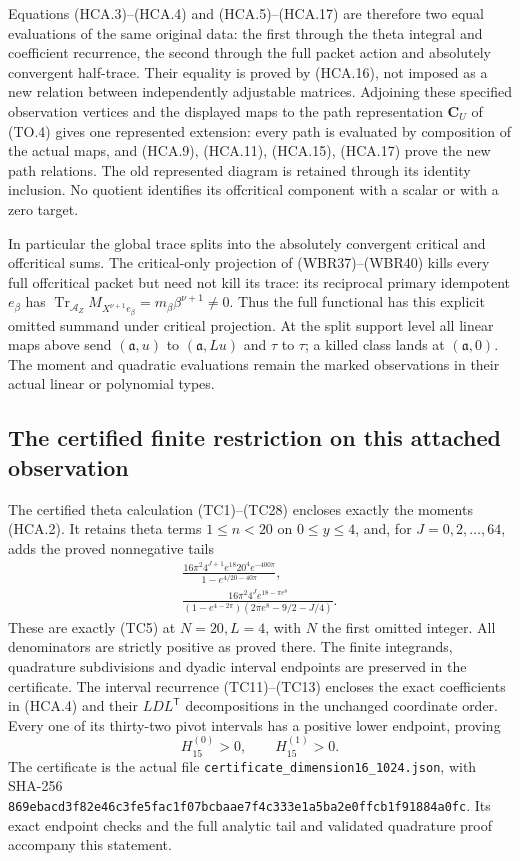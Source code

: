 Equations (HCA.3)--(HCA.4) and (HCA.5)--(HCA.17) are therefore
two equal evaluations of the same original data: the first through
the theta integral and coefficient recurrence, the second through
the full packet action and absolutely convergent half-trace.
Their equality is proved by (HCA.16), not imposed as a new
relation between independently adjustable matrices.
Adjoining these specified observation vertices and the displayed
maps to the path representation $\mathbf C_U$ of (TO.4) gives
one represented extension: every path is evaluated by composition
of the actual maps, and (HCA.9), (HCA.11), (HCA.15), (HCA.17)
prove the new path relations. The old represented diagram is
retained through its identity inclusion. No quotient identifies
its offcritical component with a scalar or with a zero target.

In particular the global trace splits into the absolutely convergent
critical and offcritical sums. The critical-only projection of
(WBR37)--(WBR40) kills every full offcritical packet but need not
kill its trace: its reciprocal primary idempotent $e_\beta$ has
$\operatorname{Tr}_{\mathcal A_Z}M_{X^{\nu+1}e_\beta}
=m_\beta\beta^{\nu+1}\ne0$. Thus the full functional has this
explicit omitted summand under critical projection. At the split
support level all linear maps above send $(\mathfrak a,u)$ to
$(\mathfrak a,Lu)$ and $\tau$ to $\tau$; a killed class lands
at $(\mathfrak a,0)$. The moment and quadratic evaluations remain
the marked observations in their actual linear or polynomial types.

\subsection{The certified finite restriction on this attached observation}

The certified theta calculation (TC1)--(TC28) encloses exactly the
moments (HCA.2). It retains theta terms $1\leq n<20$ on $0\leq y\leq4$,
and, for $J=0,2,\ldots,64$, adds the proved nonnegative tails
\[
 \begin{gathered}
 \frac{16\pi^2 4^{J+1}e^{18}20^4e^{-400\pi}}
                    {1-e^{4/20-40\pi}},\\
 \frac{16\pi^2 4^Je^{18-\pi e^8}}
 {(1-e^{4-2\pi})(2\pi e^8-9/2-J/4)}.
 \end{gathered}
 \tag{HCA.18}
\]
These are exactly (TC5) at $N=20,L=4$, with $N$ the first omitted
integer. All denominators are strictly positive as proved there.
The finite integrands, quadrature subdivisions and dyadic interval
endpoints are preserved in the certificate. The interval recurrence
(TC11)--(TC13) encloses the exact coefficients in (HCA.4) and
their $LDL^{\mathsf T}$ decompositions in the unchanged coordinate
order. Every one of its thirty-two pivot intervals has a positive
lower endpoint, proving
\[
 H_{15}^{(0)}>0,\qquad H_{15}^{(1)}>0.
 \tag{HCA.19}
\]
The certificate is the actual file
\texttt{certificate\_dimension16\_1024.json}, with SHA-256
\nolinkurl{869ebacd3f82e46c3fe5fac1f07bcbaae7f4c333e1a5ba2e0ffcb1f91884a0fc}.
Its exact endpoint checks and the full analytic tail and validated
quadrature proof accompany this statement.


